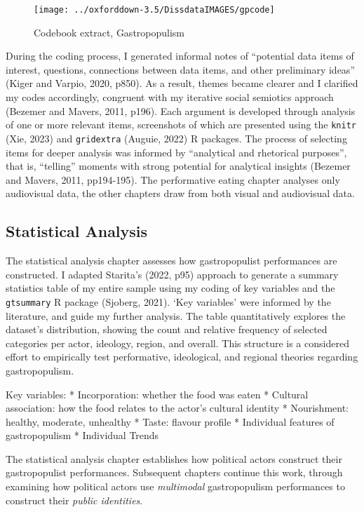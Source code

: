 \documentclass[a4paper, nobind]{templates/ociamthesis}
\begin{document}
\begin{figure}
\texttt{[image: ../oxforddown-3.5/DissdataIMAGES/gpcode]} \caption{Codebook extract, Gastropopulism}\label{fig:unnamed-chunk-4}
\end{figure}

During the coding process, I generated informal notes of ``potential data items of interest, questions, connections between data items, and other preliminary ideas'' (Kiger and Varpio, 2020, p850). As a result, themes became clearer and I clarified my codes accordingly, congruent with my iterative social semiotics approach (Bezemer and Mavers, 2011, p196). Each argument is developed through analysis of one or more relevant items, screenshots of which are presented using the \texttt{knitr} (Xie, 2023) and \texttt{gridextra} (Auguie, 2022) R packages. The process of selecting items for deeper analysis was informed by ``analytical and rhetorical purposes'', that is, ``telling'' moments with strong potential for analytical insights (Bezemer and Mavers, 2011, pp194-195). The performative eating chapter analyses only audiovisual data, the other chapters draw from both visual and audiovisual data.

\hypertarget{statistical-analysis}{%
\subsection*{Statistical Analysis}\label{statistical-analysis}}

The statistical analysis chapter assesses how gastropopulist performances are constructed. I adapted Starita's (2022, p95) approach to generate a summary statistics table of my entire sample using my coding of key variables and the \texttt{gtsummary} R package (Sjoberg, 2021). `Key variables' were informed by the literature, and guide my further analysis. The table quantitatively explores the dataset's distribution, showing the count and relative frequency of selected categories per actor, ideology, region, and overall. This structure is a considered effort to empirically test performative, ideological, and regional theories regarding gastropopulism.

Key variables:
* Incorporation: whether the food was eaten
* Cultural association: how the food relates to the actor's cultural identity
* Nourishment: healthy, moderate, unhealthy
* Taste: flavour profile
* Individual features of gastropopulism
* Individual Trends

The statistical analysis chapter establishes how political actors construct their gastropopulist performances. Subsequent chapters continue this work, through examining how political actors use \emph{multimodal} gastropopulism performances to construct their \emph{public identities}.
\end{document}
